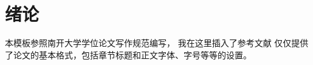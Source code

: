 
\chapter{绪论}
\label{chpt:introduction}


本模板参照南开大学学位论文写作规范编写，
我在这里插入了参考文献\cite{li2023hibrowser}
仅仅提供了论文的基本格式，包括章节标题和正文字体、字号等等的设置。
